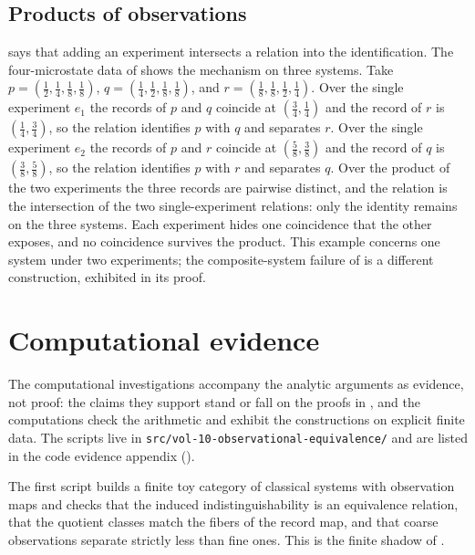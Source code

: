 \documentclass[11pt,letterpaper]{article}
\theoremstyle{definition}
\theoremstyle{remark}
\begin{document}
\subsection{Products of observations}

 says that adding an experiment intersects a relation into the identification. The four-microstate data of  shows the mechanism on three systems. Take $p = (\tfrac{1}{2}, \tfrac{1}{4}, \tfrac{1}{8}, \tfrac{1}{8})$, $q = (\tfrac{1}{4}, \tfrac{1}{2}, \tfrac{1}{8}, \tfrac{1}{8})$, and $r = (\tfrac{1}{8}, \tfrac{1}{8}, \tfrac{1}{2}, \tfrac{1}{4})$. Over the single experiment $e_1$ the records of $p$ and $q$ coincide at $(\tfrac{3}{4}, \tfrac{1}{4})$ and the record of $r$ is $(\tfrac{1}{4}, \tfrac{3}{4})$, so the relation identifies $p$ with $q$ and separates $r$. Over the single experiment $e_2$ the records of $p$ and $r$ coincide at $(\tfrac{5}{8}, \tfrac{3}{8})$ and the record of $q$ is $(\tfrac{3}{8}, \tfrac{5}{8})$, so the relation identifies $p$ with $r$ and separates $q$. Over the product of the two experiments the three records are pairwise distinct, and the relation is the intersection of the two single-experiment relations: only the identity remains on the three systems. Each experiment hides one coincidence that the other exposes, and no coincidence survives the product. This example concerns one system under two experiments; the composite-system failure of  is a different construction, exhibited in its proof.

\section{Computational evidence}
\label{sec:computations}

The computational investigations accompany the analytic arguments as evidence, not proof: the claims they support stand or fall on the proofs in , and the computations check the arithmetic and exhibit the constructions on explicit finite data. The scripts live in \texttt{src/vol-10-observational-equivalence/} and are listed in the code evidence appendix ().

The first script builds a finite toy category of classical systems with observation maps and checks that the induced indistinguishability is an equivalence relation, that the quotient classes match the fibers of the record map, and that coarse observations separate strictly less than fine ones. This is the finite shadow of .
\end{document}
